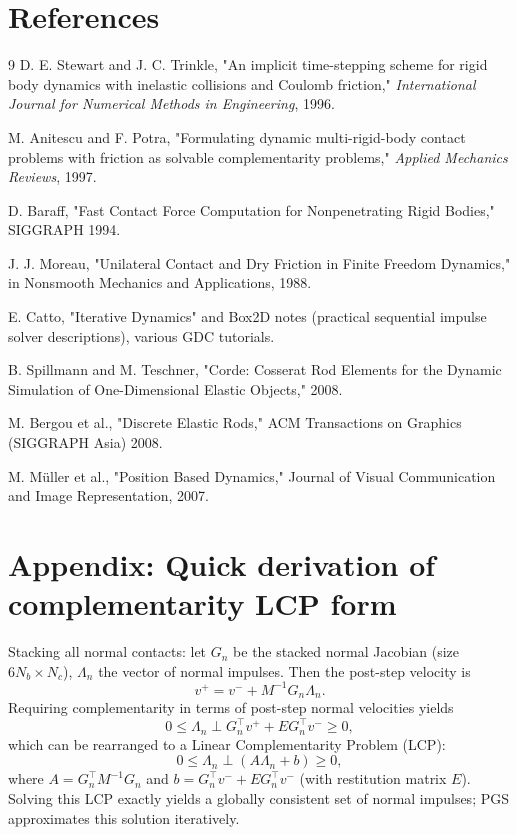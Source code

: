\documentclass[11pt,a4paper]{article}
\begin{document}
\section{References}
\begin{thebibliography}{9}
 D. E. Stewart and J. C. Trinkle, "An implicit time-stepping scheme for rigid body dynamics with inelastic collisions and Coulomb friction," \textit{International Journal for Numerical Methods in Engineering}, 1996.

 M. Anitescu and F. Potra, "Formulating dynamic multi-rigid-body contact problems with friction as solvable complementarity problems," \textit{Applied Mechanics Reviews}, 1997.

 D. Baraff, "Fast Contact Force Computation for Nonpenetrating Rigid Bodies," SIGGRAPH 1994.

 J. J. Moreau, "Unilateral Contact and Dry Friction in Finite Freedom Dynamics," in Nonsmooth Mechanics and Applications, 1988.

 E. Catto, "Iterative Dynamics" and Box2D notes (practical sequential impulse solver descriptions), various GDC tutorials.

 B. Spillmann and M. Teschner, "Corde: Cosserat Rod Elements for the Dynamic Simulation of One-Dimensional Elastic Objects," 2008.

 M. Bergou et al., "Discrete Elastic Rods," ACM Transactions on Graphics (SIGGRAPH Asia) 2008.

 M. Müller et al., "Position Based Dynamics," Journal of Visual Communication and Image Representation, 2007.
\end{thebibliography}

\section{Appendix: Quick derivation of complementarity LCP form}
Stacking all normal contacts: let $G_n$ be the stacked normal Jacobian (size $6N_b \times N_c$), $\Lambda_n$ the vector of normal impulses. Then the post-step velocity is
\[ v^+ = v^- + M^{-1} G_n \Lambda_n. \]
Requiring complementarity in terms of post-step normal velocities yields
\[ 0 \le \Lambda_n \perp G_n^\top v^+ + E G_n^\top v^- \ge 0, \]
which can be rearranged to a Linear Complementarity Problem (LCP):
\[ 0 \le \Lambda_n \perp (A \Lambda_n + b) \ge 0, \]
where $A = G_n^\top M^{-1} G_n$ and $b = G_n^\top v^- + E G_n^\top v^-$ (with restitution matrix $E$). Solving this LCP exactly yields a globally consistent set of normal impulses; PGS approximates this solution iteratively.
\end{document}
